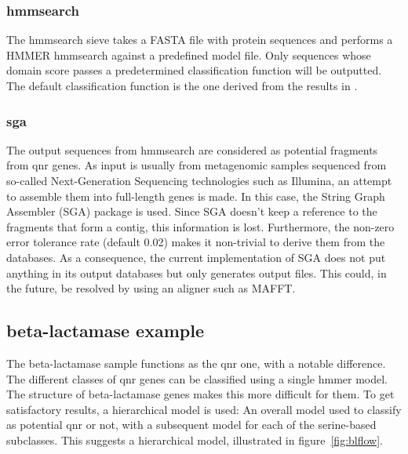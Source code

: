 \documentclass[a4paper,12pt]{article}
\begin{document}
\subsubsection{hmmsearch}
The hmmsearch sieve takes a FASTA file with protein sequences and performs a HMMER hmmsearch against a predefined model file. Only sequences whose domain score passes a predetermined classification function will be outputted. The default classification function is the one derived from the results in \cite{Boulund}.

\subsubsection{sga}
The output sequences from hmmsearch are considered as potential fragments from qnr genes. As input is usually from metagenomic samples sequenced from so-called Next-Generation Sequencing technologies such as Illumina, an attempt to assemble them into full-length genes is made. In this case, the String Graph Assembler (SGA) package is used. Since SGA doesn't keep a reference to the fragments that form a contig, this information is lost. Furthermore, the non-zero error tolerance rate (default 0.02) makes it non-trivial to derive them from the databases. As a consequence, the current implementation of SGA does not put anything in its output databases but only generates output files. This could, in the future, be resolved by using an aligner such as MAFFT.

\subsection{beta-lactamase example}
The beta-lactamase sample functions as the qnr one, with a notable difference. The different classes of qnr genes can be classified using a single hmmer model. The structure of beta-lactamase genes makes this more difficult for them. To get satisfactory results, a hierarchical model is used: An overall model used to classify as potential qnr or not, with a subsequent model for each of the serine-based subclasses. This suggests a hierarchical model, illustrated in figure~\ref{fig:blflow}.
\end{document}

